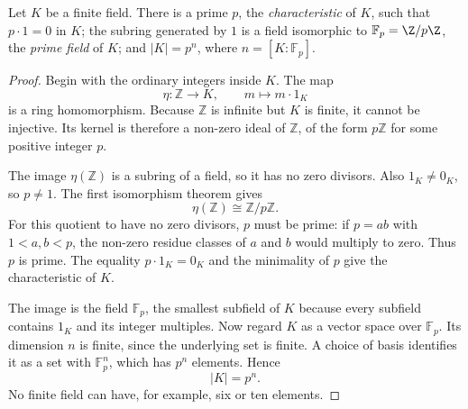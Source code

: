 \begin{proposition}\label{prop:primefield}
Let $K$ be a finite field. There is a prime $p$, the \emph{characteristic} of $K$, such that $p\cdot1=0$ in $K$; the subring generated by $1$ is a field isomorphic to $\mathbb F_p=\Z/p\Z$, the \emph{prime field} of $K$; and $|K|=p^n$, where $n=[K:\mathbb F_p]$.
\end{proposition}
\begin{proof}
Begin with the ordinary integers inside $K$.
The map
\[
\eta:\mathbb Z\longrightarrow K,\qquad
m\longmapsto m\cdot1_K
\]
is a ring homomorphism. Because $\mathbb Z$
is infinite but $K$ is finite, it cannot
be injective. Its kernel is therefore
a non-zero ideal of $\mathbb Z$, of the form
$p\mathbb Z$ for some positive integer $p$.

The image $\eta(\mathbb Z)$ is a subring
of a field, so it has no zero divisors.
Also $1_K\ne0_K$, so $p\ne1$.
The first isomorphism theorem gives
\[
\eta(\mathbb Z)\cong\mathbb Z/p\mathbb Z.
\]
For this quotient to have no zero divisors,
$p$ must be prime: if $p=ab$ with
$1<a,b<p$, the non-zero residue classes
of $a$ and $b$ would multiply to zero.
Thus $p$ is prime. The equality
$p\cdot1_K=0_K$ and the minimality of
$p$ give the characteristic of $K$.

The image is the field $\mathbb F_p$,
the smallest subfield of $K$ because
every subfield contains $1_K$ and
its integer multiples. Now regard $K$
as a vector space over $\mathbb F_p$.
Its dimension $n$ is finite, since
the underlying set is finite.
A choice of basis identifies it as
a set with $\mathbb F_p^n$, which has
$p^n$ elements. Hence
\[
\boxed{|K|=p^n}.
\]
No finite field can have, for example,
six or ten elements.
\end{proof}

